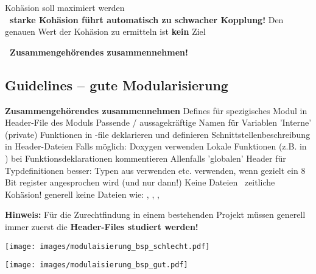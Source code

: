 \begin{outline}
    \1 Kohäsion soll maximiert werden \\
        \textbf{ \textrightarrow\ starke Kohäsion führt automatisch zu schwacher Kopplung!}
    \1 Den genauen Wert der Kohäsion zu ermitteln ist \textbf{kein} Ziel
\end{outline}

\vspace{0.1cm}

\textbf{ \textrightarrow\ Zusammengehörendes zusammennehmen!}


\subsection{Guidelines -- gute Modularisierung}

\begin{outline}
    \1 \textbf{Zusammengehörendes zusammennehmen}
        \2 Defines für spezigisches Modul in Header-File des Moduls
    \1 Passende / aussagekräftige Namen für Variablen
    \1 'Interne' (private) Funktionen in -file deklarieren und definieren
    \1 Schnittstellenbeschreibung in Header-Dateien
        \2 Falls möglich: Doxygen verwenden
    \1 Lokale Funktionen (z.B. in ) bei Funktionsdeklarationen kommentieren
    \1 Allenfalls 'globalen' Header für Typdefinitionen
        \2 besser: Typen aus  verwenden
    \1  etc. verwenden, wenn gezielt ein 8 Bit register angesprochen wird (und nur dann!)
    \1 Keine  Dateien \textrightarrow\ zeitliche Kohäsion!
        \2 generell keine Dateien wie: , , , 
\end{outline}

\vspace{0.2cm}

\textbf{Hinweis:} Für die Zurechtfindung in einem bestehenden Projekt müssen generell immer zuerst die \textbf{Header-Files studiert werden!}



\begin{minipage}[t]{0.48\columnwidth}
    \texttt{[image: images/modulaisierung\_bsp\_schlecht.pdf]}
\end{minipage}
\hfill
\begin{minipage}[t]{0.48\columnwidth}
    \texttt{[image: images/modulaisierung\_bsp\_gut.pdf]}
\end{minipage}


